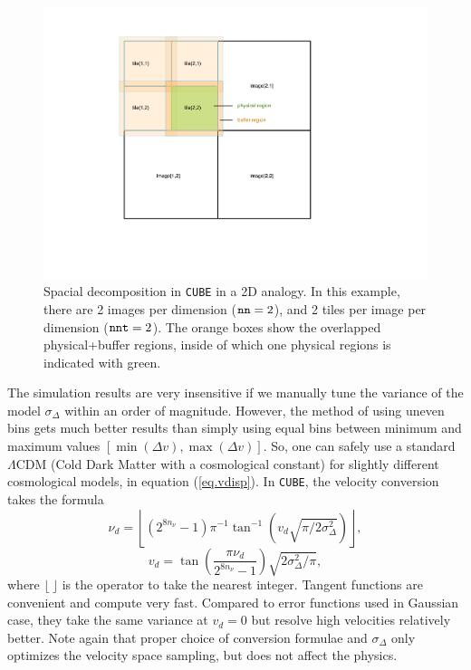 \documentclass[10pt,twocolumn,preprint]{emulateapj}
\begin{document}
\begin{figure}
\centering
  \includegraphics[width=0.95\linewidth]{fig_tile.pdf}
 \caption{Spacial decomposition in {\tt CUBE} in a 2D analogy. In this example, there are 2 images per dimension (${\tt nn}=2$), and 2 tiles per image per dimension (${\tt nnt}=2$). The orange boxes show the overlapped physical+buffer regions, inside of which one physical regions is indicated with green.}
\label{fig.tile}
\end{figure}


The simulation results are very insensitive if we manually tune the variance of the model $\sigma_\Delta$ within an order of magnitude. However, the method of using uneven bins gets much better results than simply using equal bins between minimum and maximum values $[\min(\Delta v),\max(\Delta v)]$. So, one can safely use a standard $\Lambda$CDM (Cold Dark Matter with a cosmological constant) for slightly different cosmological models, in equation (\ref{eq.vdisp}). In {\tt CUBE}, the velocity conversion takes the formula
\begin{equation}\label{eq.nu}
	\nu_d=\left\lfloor(2^{8n_\nu}-1)\pi^{-1}\tan^{-1}\left(v_d\sqrt{\pi/2\sigma_\Delta^2}\right)\right\rfloor,
\end{equation}
\begin{equation}\label{eq.v}
	v_d=\tan\left(\frac{\pi\nu_d}{2^{8n_\nu}-1}\right)\sqrt{2\sigma_\Delta^2/\pi},
\end{equation}
where $\lfloor\ \rfloor$ is the operator to take the nearest integer. 
Tangent functions are convenient and compute very fast. Compared to error 
functions used in Gaussian case, they take the same variance at $v_d=0$ but 
resolve high velocities relatively better.
Note again that proper choice of conversion formulae and $\sigma_\Delta$ 
only optimizes the velocity space sampling, but does not affect the physics. 
\end{document}
